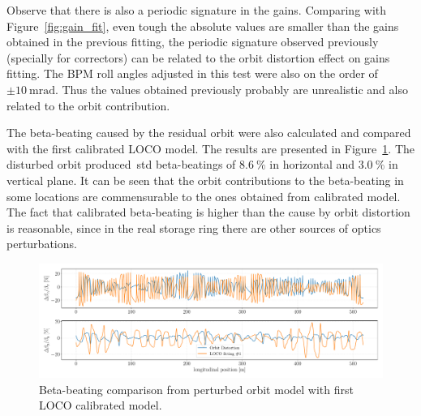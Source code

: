 Observe that there is also a periodic signature in the gains. Comparing with Figure~\ref{fig:gain_fit}, even tough the absolute values are smaller than the gains obtained in the previous fitting, the periodic signature observed previously (specially for correctors) can be related to the orbit distortion effect on gains fitting. The BPM roll angles adjusted in this test were also on the order of $\pm\SI{10}{\milli\radian}$. Thus the values obtained previously probably are unrealistic and also related to the orbit contribution.

The beta-beating caused by the residual orbit were also calculated and compared with the first calibrated LOCO model. The results are presented in Figure~\ref{fig:beta_beating_orb}. The disturbed orbit produced~\gls{std} beta-beatings of $\SI{8.6}{\%}$ in horizontal and $\SI{3.0}{\%}$ in vertical plane. It can be seen that the orbit contributions to the beta-beating in some locations are commensurable to the ones obtained from calibrated model. The fact that calibrated beta-beating is higher than the cause by orbit distortion is reasonable, since in the real storage ring there are other sources of optics perturbations. 
\begin{figure}[h!]
\centering
\includegraphics[width=1.0\textwidth]{figures/beta_beating_orbit_loco_iter0.pdf}
\caption{Beta-beating comparison from perturbed orbit model with first LOCO calibrated model.}
\label{fig:beta_beating_orb}
\end{figure}

